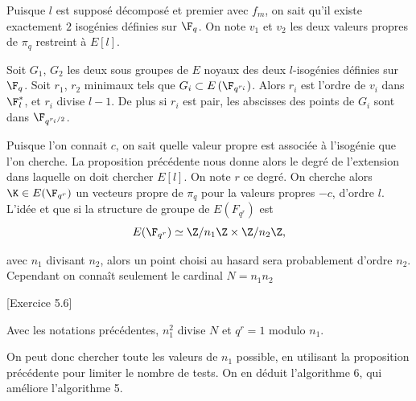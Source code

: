  Puisque $l$ est supposé décomposé et premier avec $f_{m}$, on sait qu'il existe exactement $2$ isogénies définies sur $\F_{q}$. On note $v_{1}$ et $v_{2}$ les deux valeurs propres de $\pi_{q}$ restreint à $E[l]$. 

\begin{Prop}\cite{MMSTV}
	
	Soit $G_{1}$, $G_{2}$ les deux sous groupes de $E$ noyaux des deux $l$-isogénies définies sur $\F_{q}$. Soit $r_{1}$, $r_{2}$ minimaux tels que $G_{i}\subset E\left( \F_{q^{r_{i}}}\right) $. Alors $r_{i}$ est l'ordre de $v_{i}$ dans $\F_{l}^{*}$, et $r_{i}$ divise $l-1$. De plus si $r_{i}$ est pair, les abscisses des points de $G_{i}$ sont dans $\F_{q^{r_{i}/2}}$.
\end{Prop}

Puisque l'on connait $c$, on sait quelle valeur propre est associée à l'isogénie que l'on cherche. La proposition précédente nous donne alors le degré de l'extension dans laquelle on doit chercher $E[l]$. On note $r$ ce degré. On cherche alors $\K\in E(\F_{q^{r}})$ un vecteurs propre de $\pi_{q}$ pour la valeurs propres $-c$, d'ordre $l$. L'idée et que si la structure de groupe de $E(F_{q^{r}})$ est 
\begin{equation*}
	E(\F_{q^{r}}) \simeq \Z/n_{1}\Z\times\Z/n_{2}\Z,
\end{equation*}

avec $n_{1}$ divisant $n_{2}$, alors un point choisi au hasard sera probablement d'ordre $n_{2}$. Cependant on connaît seulement le cardinal $N = n_{1}n_{2}$

\begin{Prop}\cite{Sil09}[Exercice 5.6]
	
	Avec les notations précédentes, $n_{1}^2$ divise $N$ et $q^r = 1$ modulo $n_{1}$.
\end{Prop}

On peut donc chercher toute les valeurs de $n_{1}$ possible, en utilisant la proposition précédente pour limiter le nombre de tests. On en déduit l'algorithme 6, qui améliore l'algorithme 5. 

